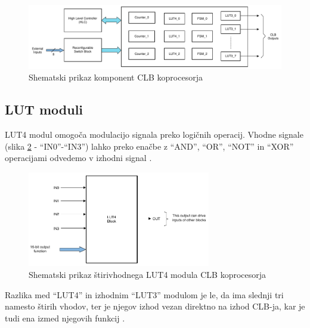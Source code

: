\documentclass[a4paper]{article}
\begin{document}
\begin{sloppypar}
\begin{figure}[t]
    \begin{center}
        \begin{minipage}[t]{12cm}
            \includegraphics[width=12cm]{clb_moduli}
            \caption{Shematski prikaz komponent CLB koprocesorja
                     \cite[Pogl.~26.2]{mcu-ref-manual}}
            \label{fig:clb_moduli}
        \end{minipage}
    \end{center}
\end{figure}

\subsection{LUT moduli}\label{sec:lut}
LUT4 modul omogoča modulacijo signala preko logičnih operacij. Vhodne signale
(slika \ref{fig:lut4} - ``IN0''-``IN3'') lahko preko enačbe z ``AND'', ``OR'',
``NOT'' in ``XOR'' operacijami odvedemo v izhodni signal
\cite[Pogl.~3.3]{clb-user-guide}.

\begin{figure}[htb]
    \centerline{\includegraphics[width=8cm]{shema_lut}}
    \caption{Shematski prikaz štirivhodnega LUT4 modula CLB koprocesorja
             \cite[Pogl.~26.4.4]{mcu-ref-manual}}
    \label{fig:lut4} 
\end{figure} 

Razlika med ``LUT4'' in izhodnim ``LUT3'' modulom je le, da ima slednji tri
namesto štirih vhodov, ter je njegov izhod vezan direktno na izhod CLB-ja, kar
je tudi ena izmed njegovih funkcij \cite[Pogl.~26.4.4-26.4.5]{mcu-ref-manual}.


\end{sloppypar}
\end{document}
